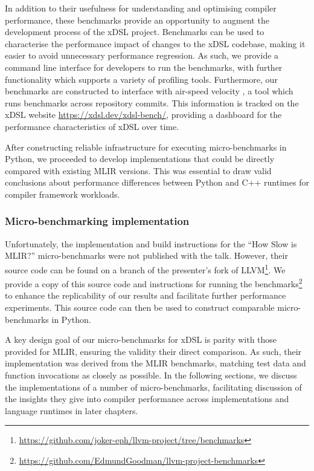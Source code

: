 In addition to their usefulness for understanding and optimising compiler performance, these benchmarks provide an opportunity to augment the development process of the xDSL project.
Benchmarks can be used to characterise the performance impact of changes to the xDSL codebase, making it easier to avoid unnecessary performance regression.
As such, we provide a command line interface for developers to run the benchmarks, with further functionality which supports a variety of profiling tools.
Furthermore, our benchmarks are constructed to interface with air-speed velocity \cite{michaeldroettboomAirspeedvelocityAsv2025}, a tool which runs benchmarks across repository commits. This information is tracked on the xDSL website \url{https://xdsl.dev/xdsl-bench/}, providing a dashboard for the performance characteristics of xDSL over time.

After constructing reliable infrastructure for executing micro-benchmarks in Python, we proceeded to develop implementations that could be directly compared with existing MLIR versions. This was essential to draw valid conclusions about performance differences between Python and C++ runtimes for compiler framework workloads.


\subsubsection{Micro-benchmarking implementation}
\label{sssec:ubenchmark-methodology-impl}

Unfortunately, the implementation and build instructions for the ``How Slow is MLIR?'' micro-benchmarks were not published with the talk.
However, their source code can be found on a branch of the presenter's fork of LLVM\footnote{\url{https://github.com/joker-eph/llvm-project/tree/benchmarks}}. We provide a copy of this source code and instructions for running the benchmarks\footnote{\url{https://github.com/EdmundGoodman/llvm-project-benchmarks}} to enhance the replicability of our results and facilitate further performance experiments.
This source code can then be used to construct comparable micro-benchmarks in Python.

A key design goal of our micro-benchmarks for xDSL is parity with those provided for MLIR, ensuring the validity their direct comparison.
As such, their implementation was derived from the MLIR benchmarks, matching test data and function invocations as closely as possible.
In the following sections, we discuss the implementations of a number of micro-benchmarks, facilitating discussion of the insights they give into compiler performance across implementations and language runtimes in later chapters.




